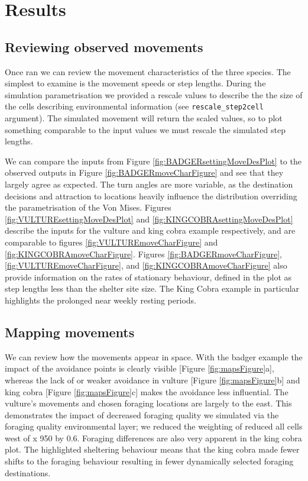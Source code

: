\documentclass[10pt,a4paper]{article}
\begin{document}
\hypertarget{results}{%
\section{Results}\label{results}}

\hypertarget{reviewing-observed-movements}{%
\subsection{Reviewing observed movements}\label{reviewing-observed-movements}}

Once ran we can review the movement characteristics of the three species.
The simplest to examine is the movement speeds or step lengths.
During the simulation parametrisation we provided a rescale values to describe the the size of the cells describing environmental information (see \texttt{rescale\_step2cell} argument).
The simulated movement will return the scaled values, so to plot something comparable to the input values we must rescale the simulated step lengths.

We can compare the inputs from Figure \ref{fig:BADGERsettingMoveDesPlot} to the observed outputs in Figure \ref{fig:BADGERmoveCharFigure} and see that they largely agree as expected.
The turn angles are more variable, as the destination decisions and attraction to locations heavily influence the distribution overriding the parametrisation of the Von Mises.
Figures \ref{fig:VULTUREsettingMoveDesPlot} and \ref{fig:KINGCOBRAsettingMoveDesPlot} describe the inputs for the vulture and king cobra example respectively, and are comparable to figures \ref{fig:VULTUREmoveCharFigure} and \ref{fig:KINGCOBRAmoveCharFigure}.
Figures \ref{fig:BADGERmoveCharFigure}, \ref{fig:VULTUREmoveCharFigure}, and \ref{fig:KINGCOBRAmoveCharFigure} also provide information on the rates of stationary behaviour, defined in the plot as step lengths less than the shelter site size.
The King Cobra example in particular highlights the prolonged near weekly resting periods.

\hypertarget{mapping-movements}{%
\subsection{Mapping movements}\label{mapping-movements}}

We can review how the movements appear in space.
With the badger example the impact of the avoidance points is clearly visible {[}Figure \ref{fig:mapsFigure}a{]}, whereas the lack of or weaker avoidance in vulture {[}Figure \ref{fig:mapsFigure}b{]} and king cobra {[}Figure \ref{fig:mapsFigure}c{]} makes the avoidance less influential.
The vulture's movements and chosen foraging locations are largely to the east.
This demonstrates the impact of decreased foraging quality we simulated via the foraging quality environmental layer; we reduced the weighting of reduced all cells west of x 950 by 0.6.
Foraging differences are also very apparent in the king cobra plot.
The highlighted sheltering behaviour means that the king cobra made fewer shifts to the foraging behaviour resulting in fewer dynamically selected foraging destinations.
\end{document}
